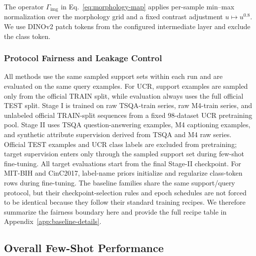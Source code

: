 \documentclass[10pt,journal,compsoc]{IEEEtran}
\begin{document}
The operator $\Gamma_{\mathrm{img}}$ in Eq.~\ref{eq:morphology-map} applies per-sample min--max normalization over the morphology grid and a fixed contrast adjustment $u\mapsto u^{0.8}$.
We use DINOv2 patch tokens from the configured intermediate layer and exclude the class token.

\subsubsection{Protocol Fairness and Leakage Control}
All methods use the same sampled support sets within each run and are evaluated on the same query examples.
For UCR, support examples are sampled only from the official TRAIN split, while evaluation always uses the full official TEST split.
Stage I is trained on raw TSQA-train series, raw M4-train series, and unlabeled official TRAIN-split sequences from a fixed 98-dataset UCR pretraining pool.
Stage II uses TSQA question-answering examples, M4 captioning examples, and synthetic attribute supervision derived from TSQA and M4 raw series.
Official TEST examples and UCR class labels are excluded from pretraining; target supervision enters only through the sampled support set during few-shot fine-tuning.
All target evaluations start from the final Stage-II checkpoint.
For MIT-BIH and CinC2017, label-name priors initialize and regularize class-token rows during fine-tuning.
The baseline families share the same support/query protocol, but their checkpoint-selection rules and epoch schedules are not forced to be identical because they follow their standard training recipes.
We therefore summarize the fairness boundary here and provide the full recipe table in Appendix~\ref{app:baseline-details}.

\subsection{Overall Few-Shot Performance}
\end{document}
